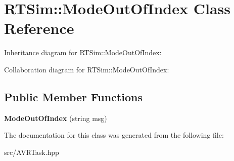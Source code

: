 \hypertarget{classRTSim_1_1ModeOutOfIndex}{}\section{R\+T\+Sim\+:\+:Mode\+Out\+Of\+Index Class Reference}
\label{classRTSim_1_1ModeOutOfIndex}


Inheritance diagram for R\+T\+Sim\+:\+:Mode\+Out\+Of\+Index\+:


Collaboration diagram for R\+T\+Sim\+:\+:Mode\+Out\+Of\+Index\+:
\subsection*{Public Member Functions}
\begin{DoxyCompactItemize}
\item 
{\bfseries Mode\+Out\+Of\+Index} (string msg)\hypertarget{classRTSim_1_1ModeOutOfIndex_a8ba1ef4dd7673db80cd37b0264435439}{}\label{classRTSim_1_1ModeOutOfIndex_a8ba1ef4dd7673db80cd37b0264435439}

\end{DoxyCompactItemize}


The documentation for this class was generated from the following file\+:\begin{DoxyCompactItemize}
\item 
src/A\+V\+R\+Task.\+hpp\end{DoxyCompactItemize}
